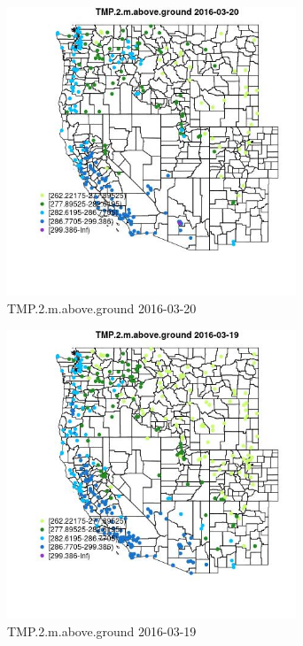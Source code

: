 \begin{figure} 
\centering  
\includegraphics[width=0.77\textwidth]{Code_Outputs/Report_ML_input_PM25_Step4_part_e_de_duplicated_aveswNAs_MapObsTMP2maboveground2016-03-20.jpg} 
\caption{\label{fig:Report_ML_input_PM25_Step4_part_e_de_duplicated_aveswNAsMapObsTMP2maboveground2016-03-20}TMP.2.m.above.ground 2016-03-20} 
\end{figure} 
 

\begin{figure} 
\centering  
\includegraphics[width=0.77\textwidth]{Code_Outputs/Report_ML_input_PM25_Step4_part_e_de_duplicated_aveswNAs_MapObsTMP2maboveground2016-03-19.jpg} 
\caption{\label{fig:Report_ML_input_PM25_Step4_part_e_de_duplicated_aveswNAsMapObsTMP2maboveground2016-03-19}TMP.2.m.above.ground 2016-03-19} 
\end{figure} 
 

